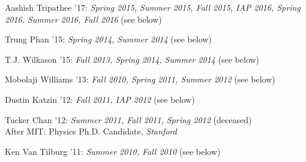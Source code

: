 \item Aashish Tripathee '17: \emph{Spring 2015, Summer 2015, Fall 2015, IAP 2016, Spring 2016, Summer 2016, Fall 2016} (see below) 

\item Trung Phan '15: \emph{Spring 2014, Summer 2014} (see below) 

\item T.J. Wilkason '15: \emph{Fall 2013, Spring 2014, Summer 2014} (see below) 

\item Mobolaji Williams '13: \emph{Fall 2010, Spring 2011, Summer 2012} (see below) 

\item Dustin Katzin '12: \emph{Fall 2011, IAP 2012} (see below) 

\item Tucker Chan '12: \emph{Summer 2011, Fall 2011, Spring 2012} (deceased) 
\\ \sh After MIT: Physics Ph.D. Candidate, \emph{Stanford}

\item Ken Van Tilburg '11: \emph{Summer 2010, Fall 2010} (see below) 

\el
